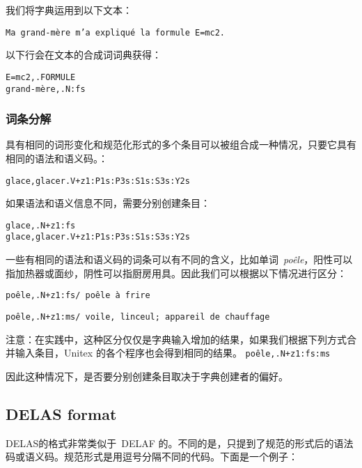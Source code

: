 \noindent 我们将字典运用到以下文本：

\verb$Ma grand-mère m’a expliqué la formule E=mc2.$


\bigskip \noindent 以下行会在文本的合成词词典获得：


\begin{verbatim}
E=mc2,.FORMULE
grand-mère,.N:fs
\end{verbatim}


\subsubsection{词条分解}

具有相同的词形变化和规范化形式的多个条目可以被组合成一种情况，只要它具有相同的语法和语义码。：


\bigskip
\begin{verbatim}
glace,glacer.V+z1:P1s:P3s:S1s:S3s:Y2s
\end{verbatim}

\bigskip 
\noindent 如果语法和语义信息不同，需要分别创建条目：


\bigskip
\begin{verbatim}
glace,.N+z1:fs
glace,glacer.V+z1:P1s:P3s:S1s:S3s:Y2s
\end{verbatim}

\bigskip 
\noindent 

一些有相同的语法和语义码的词条可以有不同的含义，比如单词\ \textit{poêle}，阳性可以指加热器或面纱，阴性可以指厨房用具。因此我们可以根据以下情况进行区分：



\bigskip
\noindent
\texttt{poêle,.N+z1:fs/ poêle à frire}

\noindent
\texttt{poêle,.N+z1:ms/ voile, linceul; appareil de chauffage}

\bigskip 
\noindent 注意：在实践中，这种区分仅仅是字典输入增加的结果，如果我们根据下列方式合并输入条目，Unitex 的各个程序也会得到相同的结果。
\bigskip
\noindent
\texttt{poêle,.N+z1:fs:ms}

\bigskip 
\noindent 因此这种情况下，是否要分别创建条目取决于字典创建者的偏好。



\subsection{DELAS format}
\label{section-DELAS-format}

DELAS的格式非常类似于\ DELAF 的。不同的是，只提到了规范的形式后的语法码或语义码。规范形式是用逗号分隔不同的代码。下面是一个例子：


